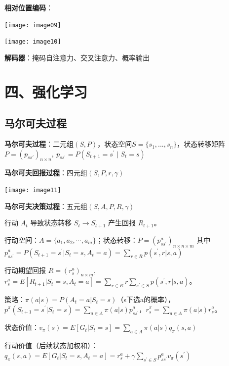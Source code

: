	\textbf{相对位置编码}：
	
	\begin{figurehere}
		\centering
		\texttt{[image: image09]}
		\label{fig:image09}
	\end{figurehere}
	\begin{figurehere}
		\centering
		\texttt{[image: image10]}
		\label{fig:image10}
	\end{figurehere}
	
	
	\textbf{解码器}：掩码自注意力、交叉注意力、概率输出
	
	\section*{四、强化学习}
	
	\subsection*{马尔可夫过程}
	
	\textbf{马尔可夫过程}：二元组$(S,P)$，状态空间$S=\{s_1,...,s_n\}$，状态转移矩阵$P=(p_{ss'})_{n\times n},~p_{ss^{\prime}} = P\left(S_{t+1} = s^{\prime} \mid S_{t} = s\right)$
	
	\textbf{马尔可夫回报过程}：四元组$(S,P,r,\gamma)$
	
	\begin{figurehere}
		\centering
		\texttt{[image: image11]}
		\label{fig:image11}
	\end{figurehere}
	\textbf{马尔可夫决策过程}：五元组$(S,A,P,R,\gamma)$
	
	行动 $A_{t}$ 导致状态转移 $S_{t}\rightarrow S_{t+1}$ 产生回报 $R_{t+1}$。
	
	行动空间：$A=\{a_{1},a_{2},\cdots,a_{m}\}$；状态转移：$P=(p_{ss^{\prime}}^{a})_{n\times n\times m}$ 其中 $p_{ss^{\prime}}^{a}=P(S_{t+1}=s^{\prime}|S_{t}=s,A_{t}=a)=\sum_{r\in R}p(s^{\prime},r|s,a)$
	
	行动期望回报 $R=(r_{s}^{a})_{n\times m}$, $r_{s}^{a}=E[R_{t+1}|S_{t}=s,A_{t}=a]=\sum_{r\in R}r\sum_{s^{\prime}\in S}p(s^{\prime},r|s,a)$。
	
	策略：$\pi(a|s)=P(A_{t}=a|S_{t}=s)$（s下选a的概率），$p^{\pi}(S_{t+1}=s^{\prime}|S_{t}=s)=\sum_{a\in A}\pi(a|s)p_{ss^{\prime}}^{a}$，$r_{s}^{\pi}=\sum_{a\in A}\pi(a|s)r_{s}^{a}$。
	
	状态价值：$v_{\pi}(s)=E[G_{t}|S_{t}=s]=\sum_{a\in A}\pi(a|s)q_{\pi}(s,a)$
	
	行动价值（后续状态加权和）：$q_{\pi}(s,a)=E[G_{t}|S_{t}=s,A_{t}=a]=r_{s}^{a}+\gamma\sum_{s^{\prime}\in S}p_{ss^{\prime}}^{a}v_{\pi}(s^{\prime})$
	
